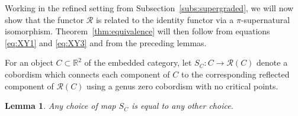 \documentclass[12pt]{amsart}
\theoremstyle{definition}
\theoremstyle{plain}
\newtheorem{lemma}{Lemma}
\begin{document}
Working in the refined setting from Subsection~\ref{subs:supergraded}, we will
now show that the functor $\mathcal{R}$ is related to the identity functor via a $\pi$-supernatural
isomorphism. Theorem~\ref{thm:equivalence} will then follow from equations \eqref{eq:XY1} and \eqref{eq:XY3} and from the preceding lemmas.

For an object $C\subset\mathbb{R}^2$ of the embedded category, let $S_C\colon C\rightarrow\mathcal{R}(C)$ denote
a cobordism which connects each component of $C$ to the corresponding reflected component of $\mathcal{R}(C)$
using a genus zero cobordism with no critical points. 

\begin{lemma}
Any choice of map $S_C$ is equal to any other choice.
\end{lemma}
\end{document}
